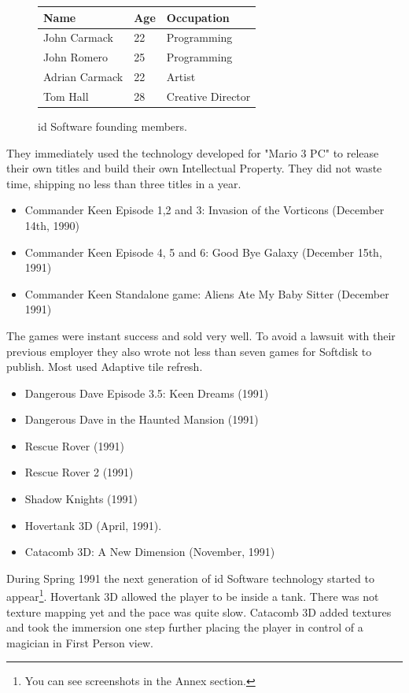 \documentclass[book.tex]{subfiles}
\begin{document}
 \begin{figure}[H]
\centering  
\begin{tabularx}{\textwidth}{ X  X  X  }
  \toprule
  \textbf{Name} &  \textbf{Age} & \textbf{Occupation} \\
  \toprule 
   John Carmack & 22 &  Programming\\
   John Romero & 25 &  Programming\\
   Adrian Carmack & 22 &  Artist\\
   Tom Hall & 28 &  Creative Director\\
     \toprule
\end{tabularx}
\caption{id Software founding members.}\label{fig:Id Software team}
\end{figure}
They immediately used the technology developed for "Mario 3 PC" to release their own titles and build their own Intellectual Property. They did not waste time, shipping no less than three titles in a year.
\begin{itemize}
    \item Commander Keen Episode 1,2 and 3: Invasion of the Vorticons (December 14th, 1990)
    \item Commander Keen Episode 4, 5 and 6: Good Bye Galaxy (December 15th, 1991)
    \item Commander Keen Standalone game: Aliens Ate My Baby Sitter (December 1991)
\end{itemize}
The games were instant success and sold very well. To avoid a lawsuit with their previous employer they also wrote not less than seven games for Softdisk to publish. Most used Adaptive tile refresh.
\begin{itemize}
  \item Dangerous Dave Episode 3.5: Keen Dreams (1991)
  \item Dangerous Dave in the Haunted Mansion (1991)
  \item Rescue Rover (1991)
  \item Rescue Rover 2 (1991)
  \item Shadow Knights (1991)
  \item Hovertank 3D (April, 1991).
  \item Catacomb 3D: A New Dimension (November, 1991)
\end{itemize}
During Spring 1991 the next generation of id Software technology started to appear\footnote{You can see screenshots in the Annex section.}. Hovertank 3D allowed the player to be inside a tank. There was not texture mapping yet and the pace was quite slow. Catacomb 3D added textures and took the immersion one step further placing the player in control of a magician in First Person view. \\
\par
\end{document}
